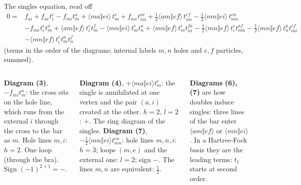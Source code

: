 \documentclass[aspectratio=169,10pt]{beamer}
\newcommand{\as}[4]{\langle #1#2\Vert #3#4\rangle}
\begin{document}
\begin{frame}{The singles equation, read off}
\footnotesize
\begin{align*}
0={}&f_{ai}+f_{ae}t_i^e-f_{mi}t_m^a+\as maei\,t_m^e
 +f_{me}t_{im}^{ae}+\tfrac12\as amef\,t_{im}^{ef}-\tfrac12\as mnei\,t_{mn}^{ea}\\
 &-f_{me}t_i^et_m^a+\as amef\,t_i^et_m^f-\as mnei\,t_m^et_n^a
 +\as mnef\,t_m^et_{ni}^{fa}-\tfrac12\as mnef\,t_i^et_{mn}^{af}-\tfrac12\as mnef\,t_n^at_{mi}^{ef}\\
 &-\as mnef\,t_i^et_m^at_n^f
\end{align*}
(terms in the order of the diagrams; internal labels $m,n$ holes and $e,f$ particles, summed).
\begin{columns}[T]
\textbf{Diagram (3)}, $-f_{mi}t_m^a$: the cross sits on the hole line, which runs from the external $i$ through the cross to the bar as $m$. Hole lines $m,i$: $h=2$. One loop (through the bra). Sign $(-1)^{2+1}=-$.

\vspace{0.4em}
\textbf{Diagram (4)}, $+\as maei t_m^e$: the single is annihilated at one vertex and the pair $(a,i)$ created at the other. $h=2$, $l=2$: $+$. The ring diagram of the singles.
\textbf{Diagram (7)}, $-\tfrac12\as mnei t_{mn}^{ea}$: hole lines $m,n,i$: $h=3$; loops $(m,e)$ and the external one: $l=2$; sign $-$. The lines $m,n$ are equivalent: $\tfrac12$.

\vspace{0.4em}
\textbf{Diagrams (6), (7)} are how doubles induce singles: three lines of the bar enter $\as amef$ or $\as mnei$. In a Hartree-Fock basis they are the leading terms: $t_1$ starts at second order.
\end{columns}
\end{frame}
\end{document}
